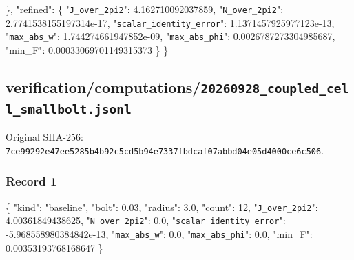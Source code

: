 \documentclass[
  10pt,
]{article}
\newenvironment{Shaded}{}{}
\newcommand{\DataTypeTok}[1]{\textcolor[rgb]{0.56,0.13,0.00}{#1}}
\newcommand{\DecValTok}[1]{\textcolor[rgb]{0.25,0.63,0.44}{#1}}
\newcommand{\FloatTok}[1]{\textcolor[rgb]{0.25,0.63,0.44}{#1}}
\newcommand{\FunctionTok}[1]{\textcolor[rgb]{0.02,0.16,0.49}{#1}}
\newcommand{\StringTok}[1]{\textcolor[rgb]{0.25,0.44,0.63}{#1}}
\begin{document}
\begin{Shaded}
\begin{Highlighting}[]
  \FunctionTok{\},}
  \DataTypeTok{"refined"}\FunctionTok{:} \FunctionTok{\{}
    \DataTypeTok{"\nolinkurl{J_over_2pi2}"}\FunctionTok{:} \FloatTok{4.162710092037859}\FunctionTok{,}
    \DataTypeTok{"\nolinkurl{N_over_2pi2}"}\FunctionTok{:} \FloatTok{2.7741538155197314e{-}17}\FunctionTok{,}
    \DataTypeTok{"\nolinkurl{scalar_identity_error}"}\FunctionTok{:} \FloatTok{1.1371457925977123e{-}13}\FunctionTok{,}
    \DataTypeTok{"\nolinkurl{max_abs_w}"}\FunctionTok{:} \FloatTok{1.744274661947852e{-}09}\FunctionTok{,}
    \DataTypeTok{"\nolinkurl{max_abs_phi}"}\FunctionTok{:} \FloatTok{0.0026787273304985687}\FunctionTok{,}
    \DataTypeTok{"min\_F"}\FunctionTok{:} \FloatTok{0.00033069701149315373}
  \FunctionTok{\}}
\FunctionTok{\}}
\end{Highlighting}
\end{Shaded}

\hypertarget{verificationcomputations20260928_coupled_cell_smallbolt.jsonl}{%
\subsection{verification/computations/\nolinkurl{20260928_coupled_cell_smallbolt.jsonl}}\label{verificationcomputations20260928_coupled_cell_smallbolt.jsonl}}

Original SHA-256:
\nolinkurl{7ce99292e47ee5285b4b92c5cd5b94e7337fbdcaf07abbd04e05d4000ce6c506}.

\hypertarget{record-1-2}{%
\subsubsection{Record 1}\label{record-1-2}}

\begin{Shaded}
\begin{Highlighting}[]
\FunctionTok{\{}
  \DataTypeTok{"kind"}\FunctionTok{:} \StringTok{"baseline"}\FunctionTok{,}
  \DataTypeTok{"bolt"}\FunctionTok{:} \FloatTok{0.03}\FunctionTok{,}
  \DataTypeTok{"radius"}\FunctionTok{:} \FloatTok{3.0}\FunctionTok{,}
  \DataTypeTok{"count"}\FunctionTok{:} \DecValTok{12}\FunctionTok{,}
  \DataTypeTok{"\nolinkurl{J_over_2pi2}"}\FunctionTok{:} \FloatTok{4.00361849438625}\FunctionTok{,}
  \DataTypeTok{"\nolinkurl{N_over_2pi2}"}\FunctionTok{:} \FloatTok{0.0}\FunctionTok{,}
  \DataTypeTok{"\nolinkurl{scalar_identity_error}"}\FunctionTok{:} \FloatTok{{-}5.968558980384842e{-}13}\FunctionTok{,}
  \DataTypeTok{"\nolinkurl{max_abs_w}"}\FunctionTok{:} \FloatTok{0.0}\FunctionTok{,}
  \DataTypeTok{"\nolinkurl{max_abs_phi}"}\FunctionTok{:} \FloatTok{0.0}\FunctionTok{,}
  \DataTypeTok{"min\_F"}\FunctionTok{:} \FloatTok{0.00353193768168647}
\FunctionTok{\}}
\end{Highlighting}
\end{Shaded}
\end{document}
